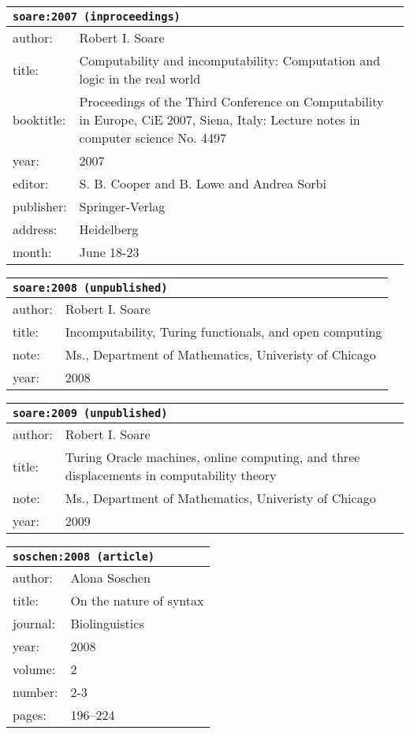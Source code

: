 \documentclass{article}
\begin{document}
\bigskip

\begin{tabular}{p{}p{}}
\multicolumn{2}{l}{\texttt{soare:2007 (inproceedings)}}\\
\hline
author: & Robert I. Soare\\
title: & Computability and incomputability: Computation and logic in the real world\\
booktitle: & Proceedings of the Third Conference on Computability in Europe, CiE 2007, Siena, Italy: Lecture notes in computer science No. 4497\\
year: & 2007\\
editor: & S. B. Cooper and B. Lowe and Andrea Sorbi\\
publisher: & Springer-Verlag\\
address: & Heidelberg\\
month: & June 18-23\\
\end{tabular}

\bigskip

\begin{tabular}{p{}p{}}
\multicolumn{2}{l}{\texttt{soare:2008 (unpublished)}}\\
\hline
author: & Robert I. Soare\\
title: & Incomputability, Turing functionals, and open computing\\
note: & \textsc{M}s., Department of Mathematics, Univeristy of Chicago\\
year: & 2008\\
\end{tabular}

\bigskip

\begin{tabular}{p{}p{}}
\multicolumn{2}{l}{\texttt{soare:2009 (unpublished)}}\\
\hline
author: & Robert I. Soare\\
title: & Turing Oracle machines, online computing, and three displacements in computability theory\\
note: & \textsc{M}s., Department of Mathematics, Univeristy of Chicago\\
year: & 2009\\
\end{tabular}

\bigskip

\begin{tabular}{p{}p{}}
\multicolumn{2}{l}{\texttt{soschen:2008 (article)}}\\
\hline
author: & Alona Soschen\\
title: & On the nature of syntax\\
journal: & Biolinguistics\\
year: & 2008\\
volume: & 2\\
number: & 2-3\\
pages: & 196--224\\
\end{tabular}
\end{document}
